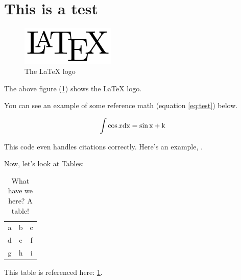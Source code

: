 \documentclass{article}
\begin{document}
\section{This is a test}

\begin{figure}
	\includegraphics[width=0.4\textwidth]{test.png}
	\caption{The LaTeX logo}
	\label{fig:latex}
\end{figure}

The above figure (\ref{fig:latex}) shows the LaTeX logo.

You can see an example of some reference math (equation \ref{eq:test}) below.

\begin{equation}\label{eq:test}
	\int \cos x \rm d x = \sin x + k
\end{equation}

This code even handles citations correctly. Here's an example, \cite{Lilley:2009zz}.

Now, let's look at Tables:

\begin{table}
	\centering
	\begin{tabular}{c|c|c}
		a & b & c \\
		d & e & f \\
		g & h & i \\
	\end{tabular}
	\caption{What have we here? A table!}\label{tbl:test}
\end{table}

This table is referenced here: \ref{tbl:test}.
\end{document}
